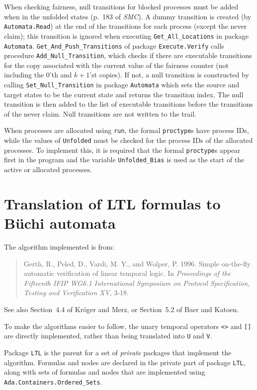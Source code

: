 \documentclass[11pt]{article}
\newcommand*{\smc}{\textit{SMC}}
\newcommand*{\p}[1]{\texttt{#1}}
\begin{document}
When checking fairness, null transitions for blocked processes must be
added when in the unfolded states (p.~183 of \smc{}). A dummy transition
is created (by \p{Automata.Read}) at the end of the transitions for each
process (except the never claim); this transition is ignored when
executing \p{Get\_All\_Locations} in package \p{Automata}.
\p{Get\_And\_Push\_Transitions} of package \p{Execute.Verify} calls
procedure \p{Add\_Null\_Transition}, which checks if there are
executable transitions for the copy associated with the current value of
the fairness counter (not including the $0$'th and $k+1$'st copies). If
not, a null transition is constructed by calling
\p{Set\_Null\_Transition} in package \p{Automata} which sets the source
and target states to be the current state and returns the transition
index. The null transition is then added to the list of executable
transitions before the transitions of the never claim. Null transitions
are not written to the trail.

When processes are allocated using \p{run}, the formal \p{proctype}s
have process IDs, while the values of \p{Unfolded} must be checked for
the process IDs of the allocated processes. To implement this, it is
required that the formal \p{proctype}s appear first in the program and
the variable \p{Unfolded\_Bias} is used as the start of the active or
allocated processes.

\newpage

\section{Translation of LTL formulas to B\"{u}chi automata}\label{s.ltl}
The algorithm implemented is from:
\begin{quote}
Gerth, R., Peled, D., Vardi, M. Y., and Wolper, P. 1996. Simple
on-the-fly automatic verification of linear temporal logic. In
\emph{Proceedings of the Fifteenth IFIP WG6.1 International Symposium on
Protocol Specification, Testing and Verification XV}, 3-18.
\end{quote}
See also Section~4.4 of Kr\"{o}ger and Merz, or Section~5.2 of Baer and
Katoen.

To make the algorithms easier to follow, the unary temporal operators
\p{<>} and \p{[]} are directly implemented, rather than being translated
into \p{U} and \p{V}.

Package \p{LTL} is the parent for a set of \emph{private} packages that
implement the algorithm. Formulas and nodes are declared in the private
part of package \p{LTL}, along with sets of formulas and nodes that are
implemented using \p{Ada.Containers.Ordered\_Sets}.
\end{document}
